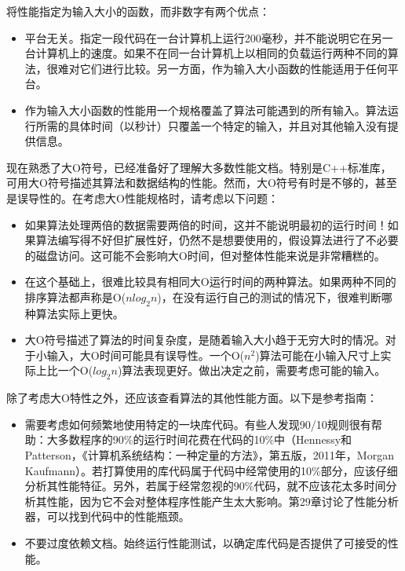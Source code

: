 将性能指定为输入大小的函数，而非数字有两个优点：

\begin{itemize}
\item
平台无关。指定一段代码在一台计算机上运行200毫秒，并不能说明它在另一台计算机上的速度。如果不在同一台计算机上以相同的负载运行两种不同的算法，很难对它们进行比较。另一方面，作为输入大小函数的性能适用于任何平台。

\item
作为输入大小函数的性能用一个规格覆盖了算法可能遇到的所有输入。算法运行所需的具体时间（以秒计）只覆盖一个特定的输入，并且对其他输入没有提供信息。
\end{itemize}


现在熟悉了大O符号，已经准备好了理解大多数性能文档。特别是C++标准库，可用大O符号描述其算法和数据结构的性能。然而，大O符号有时是不够的，甚至是误导性的。在考虑大O性能规格时，请考虑以下问题：

\begin{itemize}
\item
如果算法处理两倍的数据需要两倍的时间，这并不能说明最初的运行时间！如果算法编写得不好但扩展性好，仍然不是想要使用的，假设算法进行了不必要的磁盘访问。这可能不会影响大O时间，但对整体性能来说是非常糟糕的。

\item
在这个基础上，很难比较具有相同大O运行时间的两种算法。如果两种不同的排序算法都声称是O($n log_2 n$)，在没有运行自己的测试的情况下，很难判断哪种算法实际上更快。

\item
大O符号描述了算法的时间复杂度，是随着输入大小趋于无穷大时的情况。对于小输入，大O时间可能具有误导性。一个O($n^2$)算法可能在小输入尺寸上实际上比一个O($log_2 n$)算法表现更好。做出决定之前，需要考虑可能的输入。
\end{itemize}

除了考虑大O特性之外，还应该查看算法的其他性能方面。以下是参考指南：

\begin{itemize}
\item
需要考虑如何频繁地使用特定的一块库代码。有些人发现90/10规则很有帮助：大多数程序的90\%的运行时间花费在代码的10\%中（Hennessy和Patterson，《计算机系统结构：一种定量的方法》，第五版，2011年，Morgan Kaufmann）。若打算使用的库代码属于代码中经常使用的10\%部分，应该仔细分析其性能特征。另外，若属于经常忽视的90\%代码，就不应该花太多时间分析其性能，因为它不会对整体程序性能产生太大影响。第29章讨论了性能分析器，可以找到代码中的性能瓶颈。

\item
不要过度依赖文档。始终运行性能测试，以确定库代码是否提供了可接受的性能。
\end{itemize}

